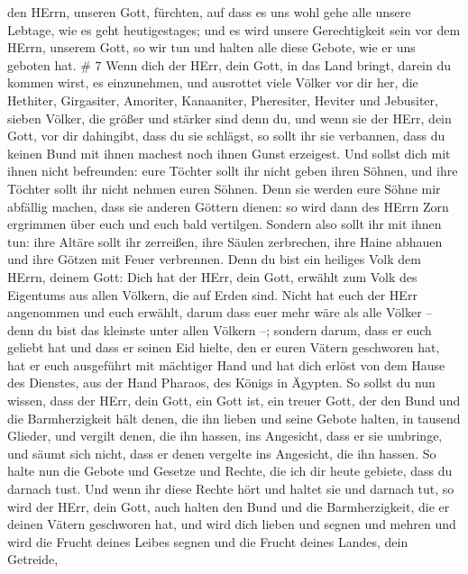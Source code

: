 den HErrn, unseren Gott, fürchten, auf dass es uns wohl gehe alle unsere
Lebtage, wie es geht heutigestages;  und es wird unsere
Gerechtigkeit sein vor dem HErrn, unserem Gott, so wir tun und halten
alle diese Gebote, wie er uns geboten hat. \# 7  Wenn dich
der HErr, dein Gott, in das Land bringt, darein du kommen wirst, es
einzunehmen, und ausrottet viele Völker vor dir her, die Hethiter,
Girgasiter, Amoriter, Kanaaniter, Pheresiter, Heviter und Jebusiter,
sieben Völker, die größer und stärker sind denn du,  und
wenn sie der HErr, dein Gott, vor dir dahingibt, dass du sie schlägst,
so sollt ihr sie verbannen, dass du keinen Bund mit ihnen machest noch
ihnen Gunst erzeigest.  Und sollst dich mit ihnen nicht
befreunden: eure Töchter sollt ihr nicht geben ihren Söhnen, und ihre
Töchter sollt ihr nicht nehmen euren Söhnen.  Denn sie
werden eure Söhne mir abfällig machen, dass sie anderen Göttern dienen:
so wird dann des HErrn Zorn ergrimmen über euch und euch bald vertilgen.
 Sondern also sollt ihr mit ihnen tun: ihre Altäre sollt ihr
zerreißen, ihre Säulen zerbrechen, ihre Haine abhauen und ihre Götzen
mit Feuer verbrennen.  Denn du bist ein heiliges Volk dem
HErrn, deinem Gott: Dich hat der HErr, dein Gott, erwählt zum Volk des
Eigentums aus allen Völkern, die auf Erden sind.  Nicht hat
euch der HErr angenommen und euch erwählt, darum dass euer mehr wäre als
alle Völker -- denn du bist das kleinste unter allen Völkern --;
 sondern darum, dass er euch geliebt hat und dass er seinen
Eid hielte, den er euren Vätern geschworen hat, hat er euch ausgeführt
mit mächtiger Hand und hat dich erlöst von dem Hause des Dienstes, aus
der Hand Pharaos, des Königs in Ägypten.  So sollst du nun
wissen, dass der HErr, dein Gott, ein Gott ist, ein treuer Gott, der den
Bund und die Barmherzigkeit hält denen, die ihn lieben und seine Gebote
halten, in tausend Glieder,  und vergilt denen, die ihn
hassen, ins Angesicht, dass er sie umbringe, und säumt sich nicht, dass
er denen vergelte ins Angesicht, die ihn hassen.  So halte
nun die Gebote und Gesetze und Rechte, die ich dir heute gebiete, dass
du darnach tust.  Und wenn ihr diese Rechte hört und haltet
sie und darnach tut, so wird der HErr, dein Gott, auch halten den Bund
und die Barmherzigkeit, die er deinen Vätern geschworen hat,
 und wird dich lieben und segnen und mehren und wird die
Frucht deines Leibes segnen und die Frucht deines Landes, dein Getreide,
